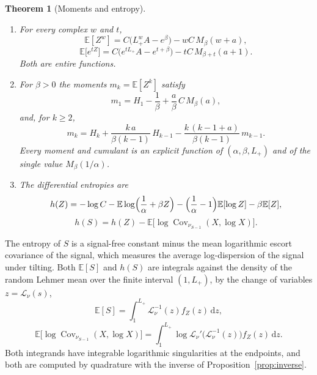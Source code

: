 \documentclass[sn-mathphys-num]{sn-jnl}\newcommand{\SNJNL}{}
\theoremstyle{thmstyleone}
\newtheorem{theorem}{Theorem}
\theoremstyle{thmstyletwo}
\theoremstyle{thmstylethree}
\theoremstyle{thmstyleone}
\providecommand{\E}{\mathbb{E}}
\providecommand{\Cov}{\operatorname{Cov}}
\providecommand{\Leh}{\mathscr{L}}
\providecommand{\dd}{\,\mathrm{d}}
\begin{document}
	\begin{theorem}[Moments and entropy]
		\label{thm:moments}\leavevmode
		\begin{enumerate}[label=\textup{(\roman*)},leftmargin=2.2em]
			\item For every complex $w$ and $t$,
			\begin{equation}\label{eq:lgmoments}
				\E[Z^{w}]=C\bigl(L_+^{w}A-e^{\beta}\bigr)-wC\,M_\beta(w+a),
			\end{equation}
			\begin{equation}\label{eq:lgmgf}
				\E\bigl[e^{tZ}\bigr]=C\bigl(e^{tL_+}A-e^{t+\beta}\bigr)-tC\,M_{\beta+t}(a+1).
			\end{equation}
			Both are entire functions.
			\item For $\beta>0$ the moments $m_k=\E[Z^{k}]$ satisfy
			\begin{equation}\label{eq:m1}
				m_1=H_1-\frac1\beta+\frac{a}{\beta}\,C\,M_\beta(a),
			\end{equation}
			and, for $k\ge2$,
			\begin{equation}\label{eq:momentrec}
				m_k=H_k+\frac{k\,a}{\beta(k-1)}\,H_{k-1}
				-\frac{k\,(k-1+a)}{\beta(k-1)}\,m_{k-1}.
			\end{equation}
			Every moment and cumulant is an explicit function of
			$(\alpha,\beta,L_+)$ and of the single value $M_\beta(1/\alpha)$.
			
			\item The differential entropies are
			\begin{equation}\label{eq:entropyZ}
				h(Z)=-\log C-\E\log\Bigl(\frac1\alpha+\beta Z\Bigr)
				-\Bigl(\frac1\alpha-1\Bigr)\E[\log Z]-\beta\E[Z],
			\end{equation}
			\begin{equation}\label{eq:entropy}
				h(S)=h(Z)-\E\bigl[\log\Cov_{\nu_{S-1}}(X,\log X)\bigr].
			\end{equation}
		\end{enumerate}
	\end{theorem}
	
	The entropy of $S$ is a signal-free constant minus the mean
	logarithmic escort covariance of the signal, which measures the
	average log-dispersion of the signal under tilting. Both $\E[S]$ and
	$h(S)$ are integrals against the density of the random
	Lehmer mean over the finite interval $(1,L_+)$, by the change of variables $z=\Leh_\nu(s)$,
	\begin{equation}\label{eq:featuresZ}
		\E[S]=\int_1^{L_+}\Leh_\nu^{-1}(z)f_Z(z)\dd z,
	\end{equation}
	\begin{equation}\label{eq:featuresZ2}
		\E\bigl[\log\Cov_{\nu_{S-1}}(X,\log X)\bigr]
		=\int_1^{L_+}\log\Leh_\nu'\bigl(\Leh_\nu^{-1}(z)\bigr)f_Z(z)\dd z .
	\end{equation}
	Both integrands have integrable logarithmic singularities at the
	endpoints, and both are computed by quadrature with the inverse of
	Proposition~\ref{prop:inverse}.
	
\end{document}
